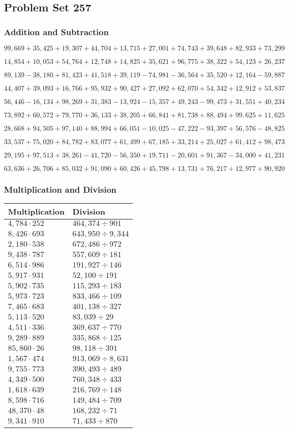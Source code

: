 \hypertarget{problem-set-257}{%
\subsection{Problem Set 257}\label{problem-set-257}}

\hypertarget{addition-and-subtraction}{%
\subsubsection{Addition and
Subtraction}\label{addition-and-subtraction}}

\(99,669+35,425+19,307+44,704+13,715+27,001+74,743+39,648+82,933+73,299\)

\(14,854+10,053+54,764+12,748+14,825+35,621+96,775+38,322+54,123+26,237\)

\(89,139-38,180+81,423+41,518+39,119-74,981-36,564+35,520+12,164-59,887\)

\(44,407+39,093+16,766+95,932+90,427+27,092+62,070+54,342+12,912+53,837\)

\(56,446-16,134+98,269+31,383-13,924-15,357+49,243-99,473+31,551+40,234\)

\(73,892+60,572+79,770+36,133+38,205+66,841+81,738+88,494+99,625+11,625\)

\(28,668+94,505+97,140+88,994+66,051-10,025-47,222-93,397+56,576-48,825\)

\(33,537+75,020+84,782+83,077+61,499+67,185+33,214+25,027+61,412+98,473\)

\(29,195+97,513+38,261-41,720-56,350+19,711-20,601+91,367-34,000+41,231\)

\(63,636+26,706+85,032+91,090+60,426+45,798+13,731+76,217+12,977+90,920\)

\hypertarget{multiplication-and-division}{%
\subsubsection{Multiplication and
Division}\label{multiplication-and-division}}

\begin{longtable}[]{@{}ll@{}}
\toprule
Multiplication & Division\tabularnewline
\midrule
\endhead
\(4,784\cdot252\) & \(464,374÷901\)\tabularnewline
\(8,426\cdot693\) & \(643,950÷9,344\)\tabularnewline
\(2,180\cdot538\) & \(672,486÷972\)\tabularnewline
\(9,438\cdot787\) & \(557,609÷181\)\tabularnewline
\(6,514\cdot986\) & \(191,927÷146\)\tabularnewline
\(5,917\cdot931\) & \(52,100÷191\)\tabularnewline
\(5,902\cdot735\) & \(115,293÷183\)\tabularnewline
\(5,973\cdot723\) & \(833,466÷109\)\tabularnewline
\(7,465\cdot683\) & \(401,138÷327\)\tabularnewline
\(5,113\cdot520\) & \(83,039÷29\)\tabularnewline
\(4,511\cdot336\) & \(369,637÷770\)\tabularnewline
\(9,289\cdot889\) & \(335,868÷125\)\tabularnewline
\(85,860\cdot26\) & \(98,118÷391\)\tabularnewline
\(1,567\cdot474\) & \(913,069÷8,631\)\tabularnewline
\(9,755\cdot773\) & \(390,493÷489\)\tabularnewline
\(4,349\cdot500\) & \(760,348÷433\)\tabularnewline
\(1,618\cdot639\) & \(216,769÷148\)\tabularnewline
\(8,598\cdot716\) & \(149,484÷709\)\tabularnewline
\(48,370\cdot48\) & \(168,232÷71\)\tabularnewline
\(9,341\cdot910\) & \(71,433÷870\)\tabularnewline
\bottomrule
\end{longtable}
